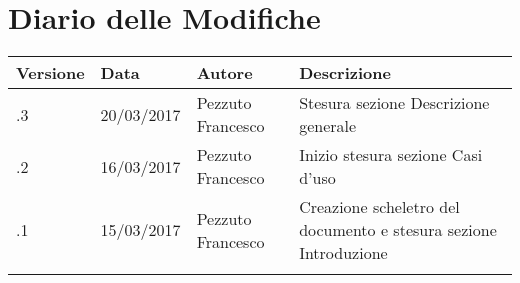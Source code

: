 \section*{Diario delle Modifiche}
\begin{longtabu} to \textwidth {
	X[4,l,p]
	X[4,l,p]
	X[4,l,p]
	X[8,l,p]}
	\toprule
		 Versione & Data & Autore & Descrizione \\
		\midrule
		\endhead
		
		\addlinespace[0.2em]
		\midrule
		.3 & 20/03/2017 & Pezzuto Francesco & Stesura sezione Descrizione generale\\
		\addlinespace[0.2em]
		\midrule
		.2 & 16/03/2017 & Pezzuto Francesco & Inizio stesura sezione Casi d'uso\\
		\addlinespace[0.2em]
		\midrule
		.1 & 15/03/2017 & Pezzuto Francesco & Creazione scheletro del documento e stesura
		sezione Introduzione\\
		\addlinespace[0.4em]
		
	\bottomrule
\end{longtabu}